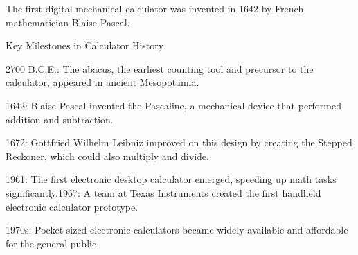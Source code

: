 The first digital mechanical calculator was invented in 1642 by French mathematician Blaise Pascal.

Key Milestones in Calculator History

2700 B.C.E.: The abacus, the earliest counting tool and precursor to the calculator, appeared in ancient Mesopotamia.

1642: Blaise Pascal invented the Pascaline, a mechanical device that performed addition and subtraction.

1672: Gottfried Wilhelm Leibniz improved on this design by creating the Stepped Reckoner, which could also multiply and divide.

1961: The first electronic desktop calculator emerged, speeding up math tasks significantly.1967: A team at Texas Instruments created the first handheld electronic calculator prototype.

1970s: Pocket-sized electronic calculators became widely available and affordable for the general public.

